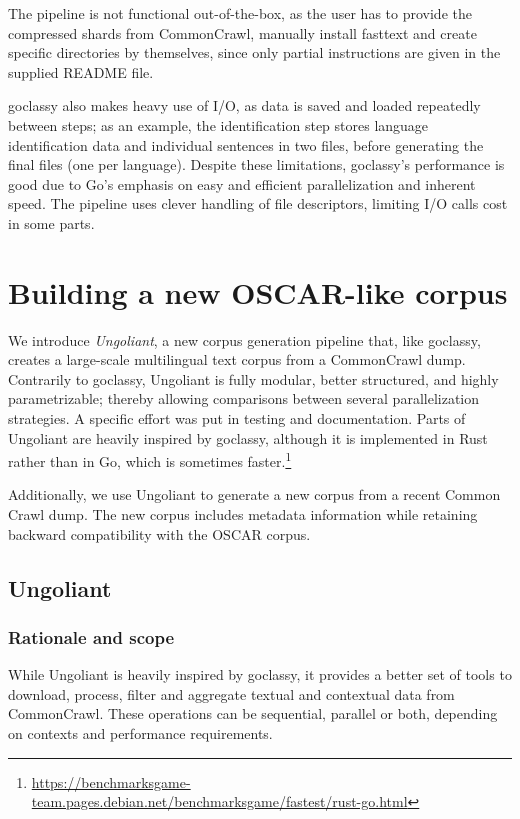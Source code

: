 The pipeline is not functional out-of-the-box, as the user has to provide the compressed shards from CommonCrawl, manually install fasttext \citep{joulin-etal-2016-fasttext,joulin-etal-2017-bag} and create specific directories by themselves, since only partial instructions are given in the supplied README file.

goclassy also makes heavy use of I/O, as data is saved and loaded repeatedly between steps; as an example, the identification step stores language identification data and individual sentences in two files, before generating the final files (one per language). Despite these limitations, goclassy's performance is good due to Go's emphasis on easy and efficient parallelization and inherent speed. The pipeline uses clever handling of file descriptors, limiting I/O calls cost in some parts.

\section{Building a new OSCAR-like corpus}

We introduce \emph{Ungoliant}, a new corpus generation pipeline that, like goclassy, creates a large-scale multilingual text corpus from a CommonCrawl dump. Contrarily to goclassy, Ungoliant is fully modular, better structured, and highly parametrizable; thereby allowing comparisons between several parallelization strategies. A specific effort was put in testing and documentation. Parts of Ungoliant are heavily inspired by goclassy, although it is implemented in Rust rather than in Go, which is sometimes faster.\footnote{\url{https://benchmarksgame-team.pages.debian.net/benchmarksgame/fastest/rust-go.html}}

Additionally, we use Ungoliant to generate a new corpus from a recent Common Crawl dump. The new corpus includes metadata information while retaining backward compatibility with the OSCAR corpus.


\subsection{Ungoliant}

\subsubsection{Rationale and scope}
\label{subsubsec:rationale}
While Ungoliant is heavily inspired by goclassy, it provides a better set of tools to download, process, filter and aggregate textual and contextual data from CommonCrawl. These operations can be sequential, parallel or both, depending on contexts and performance requirements.

